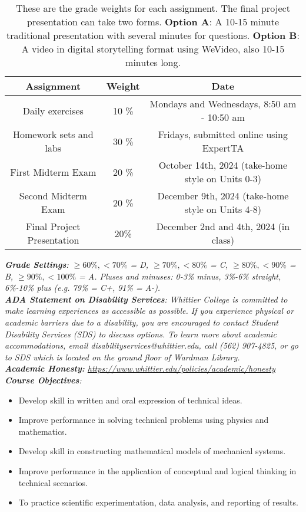 \documentclass[10pt]{article}
\begin{document}
\begin{table}
\centering
\begin{tabular}{| c | c | c |}
\hline
\textbf{Assignment} & \textbf{Weight} & \textbf{Date} \\ \hline
Daily exercises & 10 \% & Mondays and Wednesdays, 8:50 am - 10:50 am\\ \hline
Homework sets and labs & 30 \% & Fridays, submitted online using ExpertTA \\ \hline
First Midterm Exam & 20 \% & October 14th, 2024 (take-home style on Units 0-3) \\ \hline
Second Midterm Exam & 20 \% & December 9th, 2024 (take-home style on Units 4-8) \\ \hline
Final Project Presentation & 20\% & December 2nd and 4th, 2024 (in class) \\ \hline
\end{tabular}
\caption{\label{tab:grades} These are the grade weights for each assignment. The final project presentation can take two forms.  \textbf{Option A}: A 10-15 minute traditional presentation with several minutes for questions.  \textbf{Option B}: A video in digital storytelling format using WeVideo, also 10-15 minutes long.}
\end{table}
\noindent
\textit{\textbf{Grade Settings}: $\geq 60\%, <70\%$ = D, $\geq 70\%, <80\%$ = C, $\geq 80\%, <90\%$ = B, $\geq 90\%, <100\%$ = A. Pluses and minuses: 0-3\% minus, 3\%-6\% straight, 6\%-10\% plus (e.g. 79\% = C+, 91\% = A-).} \\
\textit{\textbf{ADA Statement on Disability Services}: Whittier College is committed to make learning experiences as accessible as possible. If you experience physical or academic barriers due to a disability, you are encouraged to contact Student Disability Services (SDS) to discuss options. To learn more about academic accommodations, email disabilityservices@whittier.edu, call (562) 907-4825, or go to SDS which is located on the ground floor of Wardman Library.} \\
\textit{\textbf{Academic Honesty:} \url{https://www.whittier.edu/policies/academic/honesty}} \\
\noindent
\textit{\textbf{Course Objectives}:}
\begin{itemize}
\item Develop skill in written and oral expression of technical ideas.
\item Improve performance in solving technical problems using physics and mathematics.
\item Develop skill in constructing mathematical models of mechanical systems.
\item Improve performance in the application of conceptual and logical thinking in technical scenarios.
\item To practice scientific experimentation, data analysis, and reporting of results.
\end{itemize}
\end{document}
